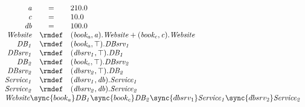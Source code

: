 \begin{displaymath}
	\begin{array}{rcl}
		\mathit{a} & = & 210.0\\
		\mathit{c} & = & 10.0\\
		\mathit{db} & = & 100.0\\
[0.0ex]		\mathit{Website} & \rmdef & (\mathit{book_a},\mathit{a}).\mathit{Website}+(\mathit{book_c},\mathit{c}).\mathit{Website}\\
		\mathit{DB_1} & \rmdef & (\mathit{book_a},\top).\mathit{DBsrv_1}\\
		\mathit{DBsrv_1} & \rmdef & (\mathit{dbsrv_1},\top).\mathit{DB_1}\\
		\mathit{DB_2} & \rmdef & (\mathit{book_c},\top).\mathit{DBsrv_2}\\
		\mathit{DBsrv_2} & \rmdef & (\mathit{dbsrv_2},\top).\mathit{DB_2}\\
		\mathit{Service_1} & \rmdef & (\mathit{dbsrv_1},\mathit{db}).\mathit{Service_1}\\
		\mathit{Service_2} & \rmdef & (\mathit{dbsrv_2},\mathit{db}).\mathit{Service_2}\\
[0.0ex]		\multicolumn{3}{l}{\mathit{Website}\sync{book_a}\mathit{DB_1}\sync{book_c}\mathit{DB_2}\sync{dbsrv_1}\mathit{Service_1}\sync{dbsrv_2}\mathit{Service_2}}\\
[0.0ex]	\end{array}
\end{displaymath}
